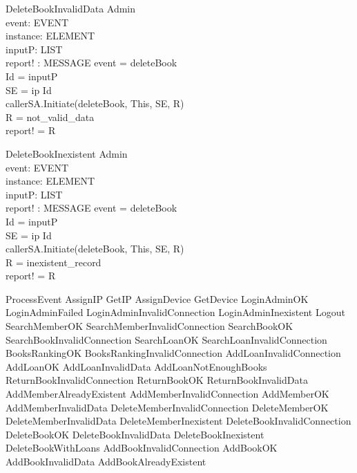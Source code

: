 \begin{schema}{DeleteBookInvalidData}
\Xi Admin \\
event: EVENT \\
instance: ELEMENT \\
inputP: LIST \\
report! : MESSAGE 
\where event = deleteBook \\
Id = \head inputP \\
SE = \lseq ip Id \rseq \\
callerSA.Initiate(deleteBook, This, SE, R) \\
R = not\_valid\_data \\ 
report! = R
\end{schema}


\begin{schema}{DeleteBookInexistent}
\Xi Admin \\
event: EVENT \\
instance: ELEMENT \\
inputP: LIST \\
report! : MESSAGE 
\where event = deleteBook \\
Id = \head inputP \\
SE = \lseq ip Id \rseq \\
callerSA.Initiate(deleteBook, This, SE, R) \\
R = inexistent\_record \\ 
report! = R
\end{schema}

\begin{zed} ProcessEvent \sdef AssignIP
\lor GetIP
\lor AssignDevice
\lor GetDevice
\lor LoginAdminOK
\lor LoginAdminFailed
\lor LoginAdminInvalidConnection
\lor LoginAdminInexistent
\lor Logout
\lor SearchMemberOK
\lor SearchMemberInvalidConnection
\lor SearchBookOK
\lor SearchBookInvalidConnection
\lor SearchLoanOK
\lor SearchLoanInvalidConnection
\lor BooksRankingOK
\lor BooksRankingInvalidConnection
\lor AddLoanInvalidConnection
\lor AddLoanOK
\lor AddLoanInvalidData
\lor AddLoanNotEnoughBooks
\lor ReturnBookInvalidConnection
\lor ReturnBookOK
\lor ReturnBookInvalidData
\lor AddMemberAlreadyExistent
\lor AddMemberInvalidConnection
\lor AddMemberOK
\lor AddMemberInvalidData
\lor DeleteMemberInvalidConnection
\lor DeleteMemberOK
\lor DeleteMemberInvalidData
\lor DeleteMemberInexistent
\lor DeleteBookInvalidConnection
\lor DeleteBookOK
\lor DeleteBookInvalidData
\lor DeleteBookInexistent
\lor DeleteBookWithLoans
\lor AddBookInvalidConnection
\lor AddBookOK
\lor AddBookInvalidData
\lor AddBookAlreadyExistent
\end{zed}



